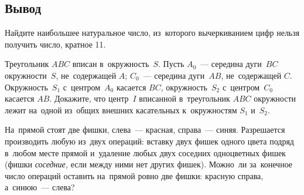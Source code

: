 



\subsection*{Вывод}

\begin{problems}

\item
Найдите наибольшее натуральное число, из~которого вычеркиванием цифр нельзя
получить число, кратное 11.

\item
Треугольник $ABC$ вписан в~окружность~$S$.
Пусть $A_0$~--- середина дуги~$BC$ окружности~$S$, не~содержащей $A$;
$C_0$~--- середина дуги~$AB$, не~содержащей $C$.
Окружность~$S_1$ с~центром~$A_0$ касается $BC$,
окружность~$S_2$ с~центром~$C_0$ касается $AB$.
Докажите, что центр~$I$ вписанной в~треугольник $ABC$ окружности лежит на~одной
из~общих внешних касательных к~окружностям $S_1$ и~$S_2$.

\item
На~прямой стоят две фишки, слева~--- красная, справа~--- синяя.
Разрешается производить любую из~двух операций:
вставку двух фишек одного цвета подряд в~любом месте прямой
и~удаление любых двух соседних одноцветных фишек
(фишки \emph{соседние,} если между ними нет других фишек).
Можно~ли за~конечное число операций оставить на~прямой ровно две фишки:
красную справа, а~синюю~--- слева?

\end{problems}

